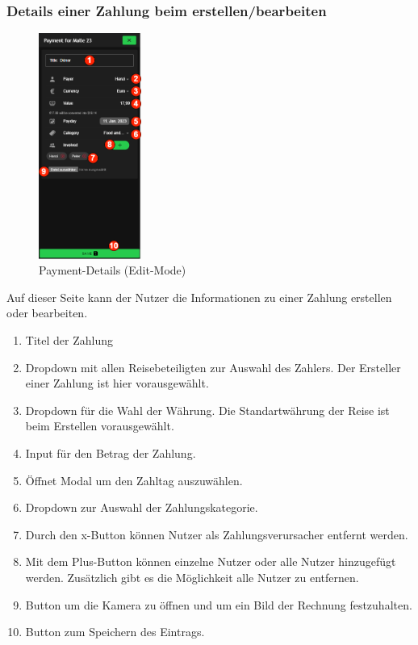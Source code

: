 \subsubsection{Details einer Zahlung beim erstellen/bearbeiten}\label{payment-details_(edit-mode)}
\begin{figure}[H]
    \centering
    \includegraphics[width=0.3\textwidth]{img/pages_numbers/payment-details_(edit-mode).drawio}
    \caption[Payment-Details (Edit-Mode)]{Payment-Details (Edit-Mode)}
    \label{fig:payment-details_(edit-mode)}
\end{figure}
Auf dieser Seite kann der Nutzer die Informationen zu einer Zahlung erstellen oder bearbeiten.
\begin{enumerate}[label=\protect\circled{\arabic*}]
	\item Titel der Zahlung
	\item Dropdown mit allen Reisebeteiligten zur Auswahl des Zahlers. Der Ersteller einer Zahlung ist hier 			vorausgewählt.
	\item Dropdown für die Wahl der Währung. Die Standartwährung der Reise ist beim Erstellen vorausgewählt.
	\item Input für den Betrag der Zahlung.
	\item Öffnet Modal um den Zahltag auszuwählen.
	\item Dropdown zur Auswahl der Zahlungskategorie.
	\item Durch den x-Button können Nutzer als Zahlungsverursacher entfernt werden.
	\item Mit dem Plus-Button können einzelne Nutzer oder alle Nutzer hinzugefügt werden. Zusätzlich gibt es die Möglichkeit alle Nutzer zu entfernen.
	\item Button um die Kamera zu öffnen und um ein Bild der Rechnung festzuhalten.
	\item Button zum Speichern des Eintrags.
\end{enumerate}


